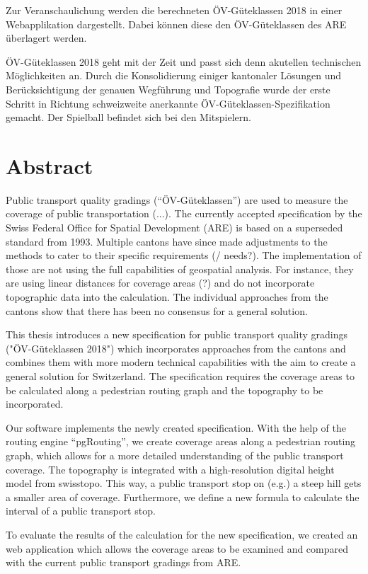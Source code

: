 Zur Veranschaulichung werden die berechneten ÖV-Güteklassen 2018 in einer
Webapplikation dargestellt.
Dabei können diese den ÖV-Güteklassen des ARE überlagert werden.

ÖV-Güteklassen 2018 geht mit der Zeit und passt sich denn akutellen technischen Möglichkeiten an.
Durch die Konsolidierung einiger kantonaler Lösungen und Berücksichtigung der genauen Wegführung und Topografie wurde der erste Schritt in Richtung schweizweite anerkannte ÖV-Güteklassen-Spezifikation gemacht.
Der Spielball befindet sich bei den Mitspielern.

\cleardoublepage

\chapter*{Abstract}

Public transport quality gradings ("`ÖV-Güteklassen"') are used to measure the coverage of public transportation (...).
The currently accepted specification by the Swiss Federal Office for Spatial Development (ARE) is based on a superseded standard from 1993.
Multiple cantons have since made adjustments to the methods to cater to their specific requirements (/ needs?).
The implementation of those are not using the full capabilities of geospatial analysis.
For instance, they are using linear distances for coverage areas (?) and do not incorporate topographic data into the calculation.
The individual approaches from the cantons show that there has been no consensus for a general solution.

This thesis introduces a new specification for public transport quality gradings ("ÖV-Güteklassen 2018") which incorporates approaches from the cantons and combines them with more modern technical capabilities with the aim to create a general solution for Switzerland.
The specification requires the coverage areas to be calculated along a pedestrian routing graph and the topography to be incorporated.

Our software implements the newly created specification.
With the help of the routing engine "`pgRouting"', we create coverage areas along a pedestrian routing graph, which allows for a more detailed understanding of the public transport coverage.
The topography is integrated with a high-resolution digital height model from swisstopo.
This way, a public transport stop on (e.g.) a steep hill gets a smaller area of coverage.
Furthermore, we define a new formula to calculate the interval of a public transport stop.

To evaluate the results of the calculation for the new specification, we created an web application which allows the coverage areas to be examined and compared with the current public transport gradings from ARE.